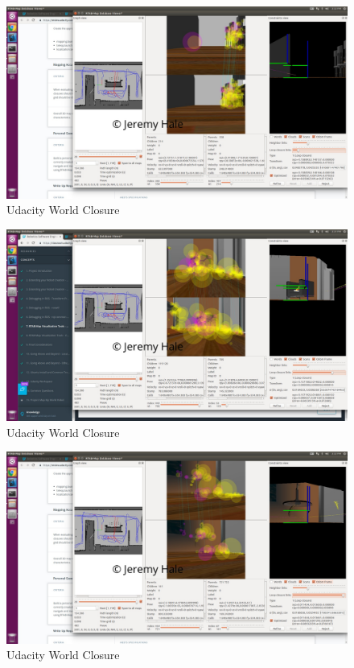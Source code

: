\documentclass[10pt,journal,compsoc]{IEEEtran}
\begin{document}
\begin{figure}
    \centering
    \includegraphics[width=\linewidth]{closure_1}
    \caption{Udacity World Closure}
    \label{fig:closure 1}
\end{figure}

\begin{figure}
    \centering
    \includegraphics[width=\linewidth]{closure_2}
    \caption{Udacity World Closure}
    \label{fig:closure 2}
\end{figure}

\begin{figure}
    \centering
    \includegraphics[width=\linewidth]{closure_3}
    \caption{Udacity World Closure}
    \label{fig:closure 3}
\end{figure}
\end{document}
